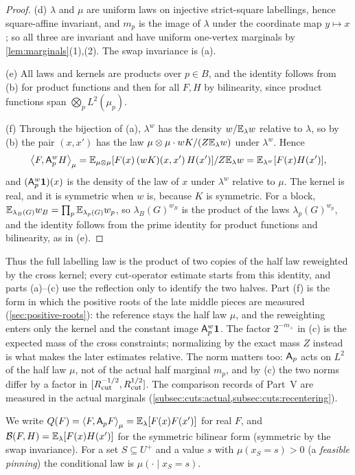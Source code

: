 \begin{proof}
(d) $\lambda$ and $\mu$ are uniform laws on injective strict-square
labellings, hence square-affine invariant, and $m_p$ is the image of $\lambda$
under the coordinate map $y\mapsto x$; so all three are invariant and have
uniform one-vertex marginals by \cref{lem:marginals}(1),(2). The swap
invariance is (a).

(e) All laws and kernels are products over $p\in B$, and the identity follows
from (b) for product functions and then for all $F,H$ by bilinearity, since
product functions span $\bigotimes_pL^2(\mu_p)$.

(f) Through the bijection of (a), $\lambda^w$ has the density
$w/\mathbb E_\lambda w$ relative to $\lambda$, so by (b) the pair $(x,x')$ has the law
$\mu\otimes\mu\cdot wK/(Z\mathbb E_\lambda w)$ under $\lambda^w$. Hence
\[
  \left\langle F,\mathsf A_p^wH\right\rangle_\mu=\mathbb E_{\mu\otimes\mu}[F(x)\,(wK)(x,x')\,H(x')]/Z\mathbb E_\lambda w
  =\mathbb E_{\lambda^w}[F(x)H(x')],
\]
and $(\mathsf A_p^w\mathbf 1)(x)$ is the density of the law of $x$ under $\lambda^w$ relative
to $\mu$. The kernel is real, and it is symmetric
when $w$ is, because $K$ is symmetric. For a block,
$\mathbb E_{\lambda_B(G)}w_B=\prod_p\mathbb E_{\lambda_p(G)}w_p$, so $\lambda_B(G)^{w_B}$ is the
product of the laws $\lambda_p(G)^{w_p}$, and the identity follows from the
prime identity for product functions and bilinearity, as in (e).
\end{proof}

Thus the full labelling law is the product of two copies of the half law
reweighted by the cross kernel; every cut-operator estimate starts from this
identity, and parts (a)--(c) use the reflection only to identify the two
halves. Part (f) is the form in which the positive roots of the late middle
pieces are measured (\cref{sec:positive-roots}): the reference stays the half
law $\mu$, and the reweighting enters only the kernel and the constant image
$\mathsf A_p^w\mathbf 1$. The factor $2^{-m_\times}$ in (c) is the expected mass of the cross
constraints; normalizing by the exact mass $Z$ instead is what makes the
later estimates relative. The norm matters too: $\mathsf A_p$ acts on $L^2$ of the
half law $\mu$, not of the actual half marginal $m_p$, and by (c) the two norms
differ by a factor in $[R_{\mathrm{cut}}^{-1/2},R_{\mathrm{cut}}^{1/2}]$. The comparison records of
Part~V are measured in the actual marginals
(\cref{subsec:cuts:actual,subsec:cuts:recentering}).

We write $Q(F)=\left\langle F,\mathsf A_p F\right\rangle_\mu=\mathbb E_\lambda[F(x)F(x')]$ for real $F$, and
$\mathcal B(F,H)=\mathbb E_\lambda[F(x)H(x')]$ for the symmetric bilinear form
(symmetric by the swap invariance). For a set $S\subseteq U^+$ and a value $s$
with $\mu(x_S=s)>0$ (a \emph{feasible pinning}) the conditional law is
$\mu(\cdot\mid x_S=s)$.

